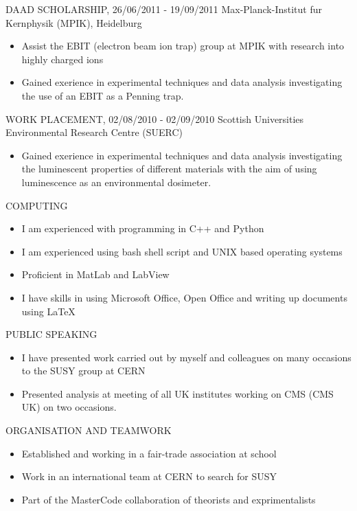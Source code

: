 \documentclass[9pt]{res} %
\begin{document}
\begin{resume}
DAAD SCHOLARSHIP, 26/06/2011 - 19/09/2011
\vspace{0.1cm}
Max-Planck-Institut fur Kernphysik (MPIK), Heidelburg
   \begin{itemize}\itemsep -2pt  %
   \item Assist the EBIT (electron beam ion trap) group at MPIK with research into highly charged ions
   \item Gained exerience in experimental techniques and data analysis investigating the use of an EBIT as a Penning trap.
   \end{itemize}

WORK PLACEMENT, 02/08/2010 - 02/09/2010
\vspace{0.1cm}
Scottish Universities Environmental Research Centre (SUERC)
   \begin{itemize} \itemsep -2pt  %
   \item Gained exerience in experimental techniques and data analysis investigating the luminescent properties of different materials with the aim of using luminescence as an environmental dosimeter.
 \end{itemize}

COMPUTING
\vspace{0.1cm}
 \begin{itemize}
   \item I am experienced with programming in C++ and Python
   \item I am experienced using bash shell script and UNIX based operating systems
   \item Proficient in MatLab and LabView
   \item I have skills in using Microsoft Office, Open Office and writing up documents using LaTeX
 \end{itemize}

PUBLIC SPEAKING
 \begin{itemize}
   \item I have presented work carried out by myself and colleagues on many occasions to the SUSY group at CERN 
   \item Presented analysis at meeting of all UK institutes working on CMS (CMS UK) on two occasions.
 \end{itemize}
\vspace{0.1cm}

ORGANISATION AND TEAMWORK
\vspace{0.1cm}
\begin{itemize}
   \item Established and working in a fair-trade association at school
   \item Work in an international team at CERN to search for SUSY 
   \item Part of the MasterCode collaboration of theorists and exprimentalists
\end{itemize}


\end{resume}
\end{document}
